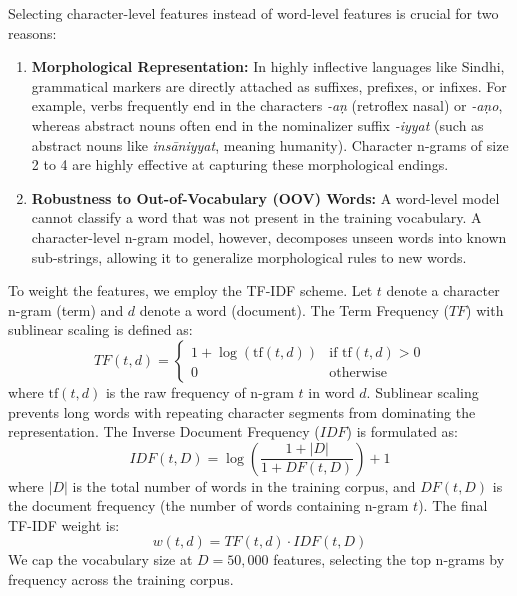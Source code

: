 \documentclass[12pt,a4paper]{article}
\begin{document}
Selecting character-level features instead of word-level features is crucial for two reasons:
\begin{enumerate}
  \item \textbf{Morphological Representation:} In highly inflective languages like Sindhi, grammatical markers are directly attached as suffixes, prefixes, or infixes. For example, verbs frequently end in the characters \emph{-a\d{n}} (retroflex nasal) or \emph{-a\d{n}o}, whereas abstract nouns often end in the nominalizer suffix \emph{-iyyat} (such as abstract nouns like \emph{ins\={a}niyyat}, meaning humanity). Character n-grams of size 2 to 4 are highly effective at capturing these morphological endings.
  \item \textbf{Robustness to Out-of-Vocabulary (OOV) Words:} A word-level model cannot classify a word that was not present in the training vocabulary. A character-level n-gram model, however, decomposes unseen words into known sub-strings, allowing it to generalize morphological rules to new words.
\end{enumerate}

To weight the features, we employ the TF-IDF scheme. Let $t$ denote a character n-gram (term) and $d$ denote a word (document). The Term Frequency ($TF$) with sublinear scaling is defined as:
\begin{equation}
  TF(t, d) = \begin{cases}
    1 + \log(\text{tf}(t, d)) & \text{if } \text{tf}(t, d) > 0 \\
    0 & \text{otherwise}
  \end{cases}
\end{equation}
where $\text{tf}(t, d)$ is the raw frequency of n-gram $t$ in word $d$. Sublinear scaling prevents long words with repeating character segments from dominating the representation. The Inverse Document Frequency ($IDF$) is formulated as:
\begin{equation}
  IDF(t, D) = \log \left( \frac{1 + |D|}{1 + DF(t, D)} \right) + 1
\end{equation}
where $|D|$ is the total number of words in the training corpus, and $DF(t, D)$ is the document frequency (the number of words containing n-gram $t$). The final TF-IDF weight is:
\begin{equation}
  w(t, d) = TF(t, d) \cdot IDF(t, D)
\end{equation}
We cap the vocabulary size at $D = 50,000$ features, selecting the top n-grams by frequency across the training corpus.
\end{document}

